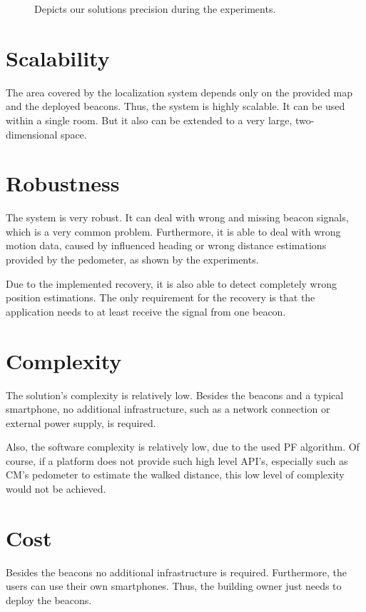 
\begin{figure}
	
	\caption{Depicts our solutions precision during the experiments.}
	\label{fig:eval:precision}
\end{figure}



\section{Scalability}
The area covered by the localization system depends only on the provided map and the deployed beacons. Thus, the system is highly scalable. It can be used within a single room. But it also can be extended to a very large, two-dimensional space.

\section{Robustness}
The system is very robust. It can deal with wrong and missing beacon signals, which is a very common problem. Furthermore, it is able to deal with wrong motion data, caused by influenced heading or wrong distance estimations provided by the pedometer, as shown by the experiments.

Due to the implemented recovery, it is also able to detect completely wrong position estimations. The only requirement for the recovery is that the application needs to at least receive the signal from one beacon.

\section{Complexity}
The solution's complexity is relatively low. Besides the beacons and a typical smartphone, no additional infrastructure, such as a network connection or external power supply, is required.
	
Also, the software complexity is relatively low, due to the used \ac{PF} algorithm. Of course, if a platform does not provide such high level \acs{API}'s, especially such as \acl{CM}'s pedometer to estimate the walked distance, this low level of complexity would not be achieved.

\section{Cost}
Besides the beacons no additional infrastructure is required. Furthermore, the users can use their own smartphones. Thus, the building owner just needs to deploy the beacons.

